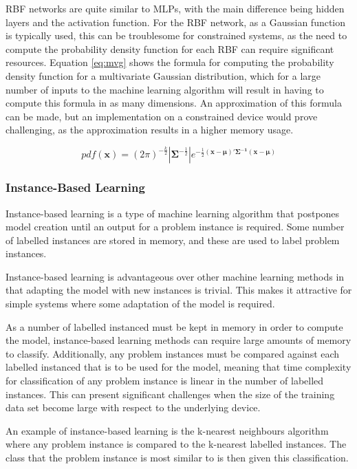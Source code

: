 RBF networks are quite similar to MLPs, with the main difference being hidden layers and the activation function. For the RBF network, as a Gaussian function is typically used, this can be troublesome for constrained systems, as the need to compute the probability density function for each RBF can require significant resources. Equation \ref{eq:mvg} shows the formula for computing the probability density function for a multivariate Gaussian distribution, which for a large number of inputs to the machine learning algorithm will result in having to compute this formula in as many dimensions. An approximation of this formula can be made, but an implementation on a constrained device would prove challenging, as the approximation results in a higher memory usage.

\begin{equation}
	pdf(\mathbf{x}) = (2\pi)^{-\frac{k}{2}}|\mathbf{\Sigma}^{-\frac{1}{2}}|e^{-\frac{1}{2}(\mathbf{x}-\mathbf{\mu})'\mathbf{\Sigma^{-1}}(\mathbf{x}-\mathbf{\mu})}
	\label{eq:mvg}
\end{equation}

\subsubsection{Instance-Based Learning}
Instance-based learning is a type of machine learning algorithm that postpones model creation until an output for a problem instance is required. Some number of labelled instances are stored in memory, and these are used to label problem instances.

Instance-based learning is advantageous over other machine learning methods in that adapting the model with new instances is trivial. This makes it attractive for simple systems where some adaptation of the model is required.

As a number of labelled instanced must be kept in memory in order to compute the model, instance-based learning methods can require large amounts of memory to classify. Additionally, any problem instances must be compared against each labelled instanced that is to be used for the model, meaning that time complexity for classification of any problem instance is linear in the number of labelled instances. This can present significant challenges when the size of the training data set become large with respect to the underlying device.

An example of instance-based learning is the k-nearest neighbours algorithm where any problem instance is compared to the k-nearest labelled instances. The class that the problem instance is most similar to is then given this classification. 

